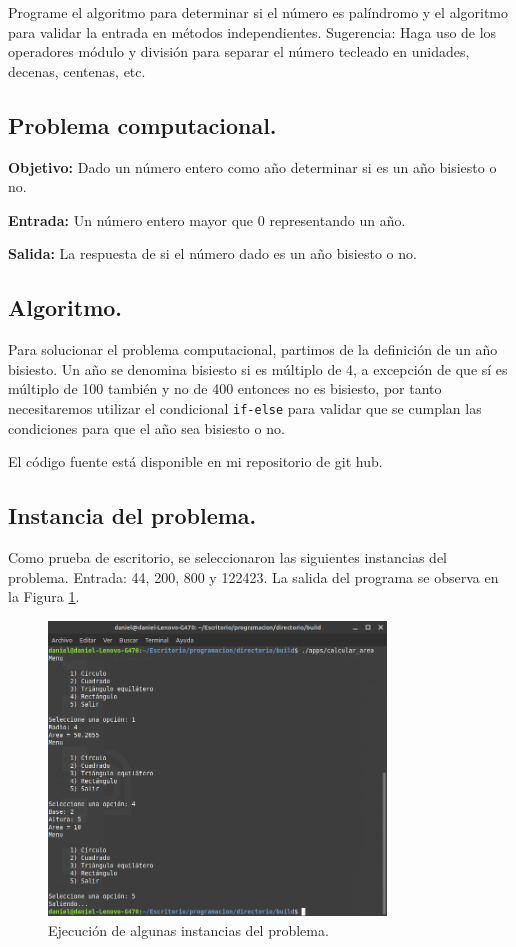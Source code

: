 \documentclass[12pt,letterpaper]{article}
\begin{document}
{Programe el algoritmo para determinar si el n\'umero es pal\'indromo y el algoritmo para validar la entrada en m\'etodos independientes.
Sugerencia: Haga uso de los operadores m\'odulo y divisi\'on para separar el n\'umero tecleado en unidades, decenas, centenas, etc.

\subsection{Problema computacional.}
\textbf{Objetivo:} Dado un n\'umero entero como año determinar si es un año bisiesto o no.

\textbf{Entrada:} Un n\'umero entero mayor que 0 representando un año.

\textbf{Salida:} La respuesta de si el n\'umero dado es un año bisiesto o no.

\subsection{Algoritmo.}
Para solucionar el problema computacional, partimos de la definici\'on de un año bisiesto. Un año se denomina bisiesto si es m\'ultiplo de 4, a excepci\'on de que s\'i es m\'ultiplo de 100 tambi\'en y no de 400 entonces no es bisiesto, por tanto necesitaremos utilizar el condicional \texttt{if-else} para validar que se cumplan las condiciones para que el año sea bisiesto o no.


El código fuente está disponible en mi repositorio de git hub. \cite{url:basilea}

\subsection{Instancia del problema.}
Como prueba de escritorio, se seleccionaron las siguientes instancias del problema. Entrada: 44, 200, 800 y 122423. La salida del programa se observa en la Figura \ref{fig:bisiesto}.
\begin{figure}[ht!]
  \centering
  \includegraphics[width=0.8\textwidth]{figures/calcular_area}
  \caption{Ejecución de algunas instancias del problema.}
  \label{fig:bisiesto}
\end{figure}

}
\end{document}
